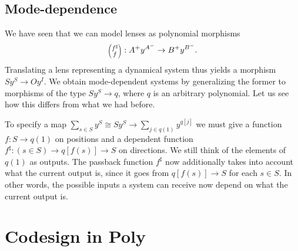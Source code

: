 \documentclass[12pt, a4paper]{article}
\theoremstyle{definition}
\theoremstyle{plain}
\theoremstyle{plain}
\theoremstyle{plain}
\theoremstyle{plain}
\theoremstyle{plain}
\theoremstyle{remark}
\theoremstyle{remark}
\newcommand{\lens}[2]{\scaleobj{0.6}{\begin{pmatrix} \scaleobj{1.3}{{#1}} \\ \scaleobj{1.3}{{#2}} \end{pmatrix}}}
\begin{document}
\subsection{Mode-dependence}
We have seen that we can model lenses as polynomial morphisms 
$$\lens{f^\sharp}{f} :A^+ y^{A^-} \rightarrow B^+ y^{B^-} .$$
Translating a lens representing a dynamical system thus yields a morphism
$S y^S \rightarrow O y^I$. We obtain mode-dependent systems by generalizing the former to morphisms of the type $S y^S \rightarrow q$, where $q$ is an arbitrary polynomial. Let us see how this differs from what we had before.

To specify a map $\sum_{s \in S} y^S \cong S y^S \rightarrow \sum_{j \in q(1)} y^{q[j]}$ we must give a function $f: S \rightarrow q(1)$ on positions and a dependent function $f^\sharp: (s \in S) \rightarrow q[f(s)] \rightarrow S$ on directions. We still think of the elements of $q(1)$ as outputs. The passback function $f^\sharp$ now additionally takes into account what the current output is, since it goes from $q[f(s)] \rightarrow S$ for each $s \in S$. In other words, the possible inputs a system can receive now depend on what the current output is.

\section{Codesign in \textsf{Poly}}
\end{document}
